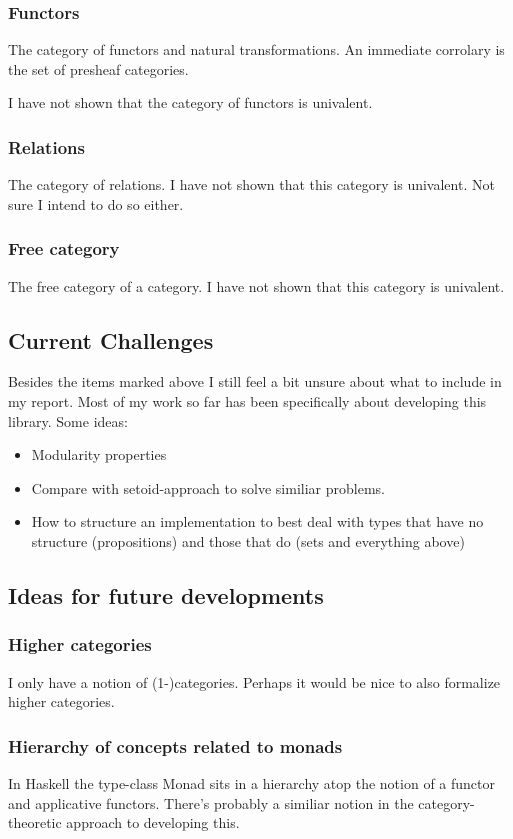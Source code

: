 \subsubsection{Functors}
The category of functors and natural transformations. An immediate corrolary is
the set of presheaf categories.

\WIP{} I have not shown that the category of functors is univalent.

\subsubsection{Relations}
The category of relations. \WIP{} I have not shown that this category is
univalent. Not sure I intend to do so either.

\subsubsection{Free category}
The free category of a category. \WIP{} I have not shown that this category is
univalent.

\subsection{Current Challenges}
Besides the items marked \WIP{} above I still feel a bit unsure about what to
include in my report. Most of my work so far has been specifically about
developing this library. Some ideas:
%
\begin{itemize}
\item
  Modularity properties
\item
  Compare with setoid-approach to solve similiar problems.
\item
  How to structure an implementation to best deal with types that have no
  structure (propositions) and those that do (sets and everything above)
\end{itemize}
%
\subsection{Ideas for future developments}
\subsubsection{Higher categories}
I only have a notion of (1-)categories. Perhaps it would be nice to also
formalize higher categories.

\subsubsection{Hierarchy of concepts related to monads}
In Haskell the type-class Monad sits in a hierarchy atop the notion of a functor
and applicative functors. There's probably a similiar notion in the
category-theoretic approach to developing this.

